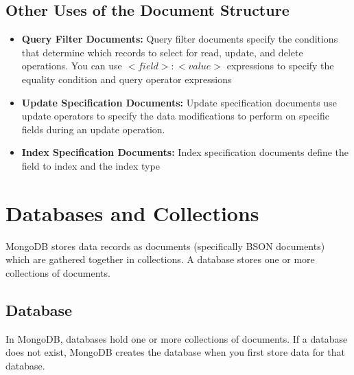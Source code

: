 \subsection{Other Uses of the Document Structure}
\begin{itemize}
    \item \textbf{Query Filter Documents:} Query filter documents specify the conditions that determine which records to select for read, update, and delete operations. You can use \(<field>:<value>\) expressions to specify the equality condition and query operator expressions
    \item \textbf{Update Specification Documents:} Update specification documents use update operators to specify the data modifications to perform on specific fields during an update operation.
    \item \textbf{Index Specification Documents:} Index specification documents define the field to index and the index type
\end{itemize}

\section{Databases and Collections}
MongoDB stores data records as documents (specifically BSON documents) which are gathered together in collections. A database stores one or more collections of documents.

\subsection{Database}
In MongoDB, databases hold one or more collections of documents. If a database does not exist, MongoDB creates the database when you first store data for that database.


